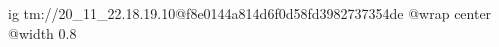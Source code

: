  
 
 
 
 

\qqSecOrig


\ifcmt
  ig tm://20_11_22.18.19.10@f8e0144a814d6f0d58fd3982737354de
  @wrap center
  @width 0.8
\fi

